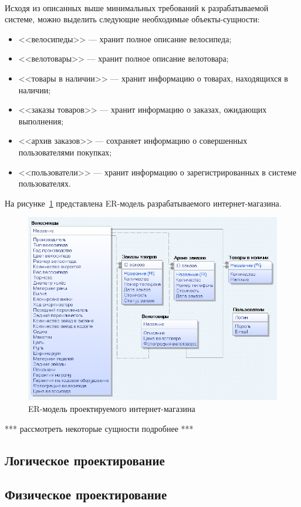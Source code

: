 \paragraph{}
Исходя из описанных выше минимальных требований к разрабатываемой
системе, можно выделить следующие необходимые объекты-сущности:
\begin{itemize}
  \item <<велосипеды>> --- хранит полное описание велосипеда;
  \item <<велотовары>> --- хранит полное описание велотовара;
  \item <<товары в наличии>> --- хранит информацию о товарах, находящихся в наличии;
  \item <<заказы товаров>> --- хранит информацию о заказах, ожидающих выполнения;
  \item <<архив заказов>> --- сохраняет информацию о совершенных пользователями
    покупках;
  \item <<пользователи>> --- хранит информацию о зарегистрированных
    в системе пользователях.
\end{itemize}

На рисунке~\ref{fig:ER_model} представлена ER-модель
разрабатываемого интернет-магазина.

\begin{figure}[h]
  \centering
  \includegraphics[width=165mm]{pic/ER.png}
  \caption{ER-модель проектируемого интернет-магазина}
  \label{fig:ER_model}
\end{figure}

*** рассмотреть некоторые сущности подробнее ***


\subsection{Логическое проектирование}
\label{sub:db_structure_logical_design}

\subsection{Физическое проектирование}
\label{sub:db_structure_physical_design}



\pagebreak

